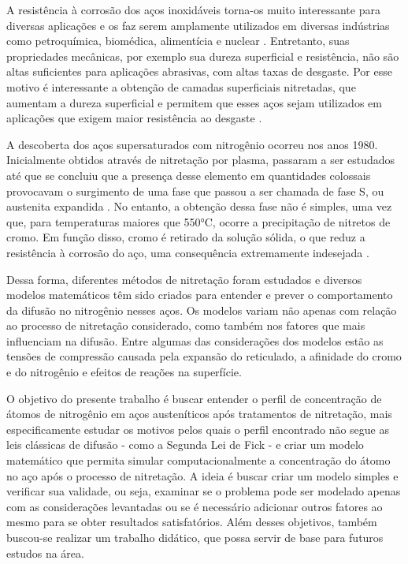 A resistência à corrosão dos aços inoxidáveis torna-os muito interessante para diversas aplicações e os faz serem amplamente utilizados em diversas indústrias como petroquímica, biomédica, alimentícia e nuclear \cite{peng2018numerical}. Entretanto, suas propriedades mecânicas, por exemplo sua dureza superficial e resistência, não são altas suficientes para aplicações abrasivas, com altas taxas de desgaste. Por esse motivo é interessante a obtenção de camadas superficiais nitretadas, que aumentam a dureza superficial e permitem que esses aços sejam utilizados em aplicações que exigem maior resistência ao desgaste \cite{moller2001surface}.

A descoberta dos aços supersaturados com nitrogênio ocorreu nos anos 1980. Inicialmente obtidos através de nitretação por plasma, passaram a ser estudados até que se concluiu que a presença desse elemento em quantidades colossais provocavam o surgimento de uma fase que passou a ser chamada de fase S, ou austenita expandida \cite{christiansen2006controlled}. No entanto, a obtenção dessa fase não é simples, uma vez que, para temperaturas maiores que 550°C, ocorre a precipitação de nitretos de cromo. Em função disso, cromo é retirado da solução sólida, o que reduz a resistência à corrosão do aço, uma consequência extremamente indesejada \cite{tschiptschin2010estrutura}.

Dessa forma, diferentes métodos de nitretação foram estudados e diversos modelos matemáticos têm sido criados para entender e prever o comportamento da difusão no nitrogênio nesses aços. Os modelos variam não apenas com relação ao processo de nitretação considerado, como também nos fatores que mais influenciam na difusão. Entre algumas das considerações dos modelos estão as tensões de compressão causada pela expansão do reticulado, a afinidade do cromo e do nitrogênio e efeitos de reações na superfície.

O objetivo do presente trabalho é buscar entender o perfil de concentração de átomos de nitrogênio em aços austeníticos após tratamentos de nitretação, mais especificamente estudar os motivos pelos quais o perfil encontrado não segue as leis clássicas de difusão - como a Segunda Lei de Fick - e criar um modelo matemático que permita simular computacionalmente a concentração do átomo no aço após o processo de nitretação. A ideia é buscar criar um modelo simples e verificar sua validade, ou seja, examinar se o problema pode ser modelado apenas com as considerações levantadas ou se é necessário adicionar outros fatores ao mesmo para se obter resultados satisfatórios.
Além desses objetivos, também buscou-se realizar um trabalho didático, que possa servir de base para futuros estudos na área.